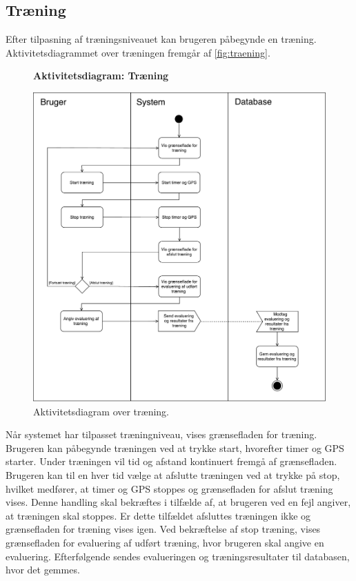 \subsection*{Træning} \label{sec:traening}
Efter tilpasning af træningsniveauet kan brugeren påbegynde en træning. Aktivitetsdiagrammet over træningen fremgår af \autoref{fig:traening}. 

\begin{figure} [H]
\centering
\textbf{Aktivitetsdiagram: Træning}\par\medskip
\includegraphics[width=1\textwidth]{figures/aktivitetsdiagram/Traening}
\caption{Aktivitetsdiagram over træning.}
\label{fig:traening}
\end{figure}

\noindent
Når systemet har tilpasset træningniveau, vises grænsefladen for træning. Brugeren kan påbegynde træningen ved at trykke start, hvorefter timer og GPS starter. Under træningen vil tid og afstand kontinuert fremgå af grænsefladen. Brugeren kan til en hver tid vælge at afslutte træningen ved at trykke på stop, hvilket medfører, at timer og GPS stoppes og grænsefladen for afslut træning vises. Denne handling skal bekræftes i tilfælde af, at brugeren ved en fejl angiver, at træningen skal stoppes. Er dette tilfældet afsluttes træningen ikke og grænsefladen for træning vises igen. Ved bekræftelse af stop træning, vises grænsefladen for evaluering af udført træning, hvor brugeren skal angive en evaluering. Efterfølgende sendes evalueringen og træningsresultater til databasen, hvor det gemmes.

